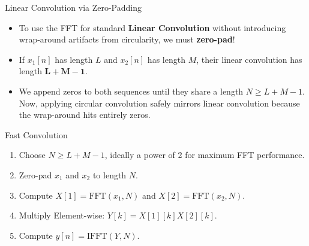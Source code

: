 \begin{frame}{Linear Convolution via Zero-Padding}
    \begin{itemize}
        \item To use the FFT for standard \textbf{Linear Convolution} without introducing wrap-around artifacts from circularity, we must \textbf{zero-pad}!
        \item If $x_1[n]$ has length $L$ and $x_2[n]$ has length $M$, their linear convolution has length $\mathbf{L+M-1}$.
        \item We append zeros to both sequences until they share a length $N \ge L+M-1$. Now, applying circular convolution safely mirrors linear convolution because the wrap-around hits entirely zeros.
    \end{itemize}
    \vspace{0.4cm}
    \begin{algorithmbox}{Fast Convolution}
        \begin{enumerate}
            \item Choose $N \ge L+M-1$, ideally a power of 2 for maximum FFT performance.
            \item Zero-pad $x_1$ and $x_2$ to length $N$.
            \item Compute $X[1] = \text{FFT}(x_1, N)$ and $X[2] = \text{FFT}(x_2, N)$.
            \item Multiply Element-wise: $Y[k] = X[1][k] X[2][k]$.
            \item Compute $y[n] = \text{IFFT}(Y, N)$.
        \end{enumerate}
    \end{algorithmbox}
\end{frame}

